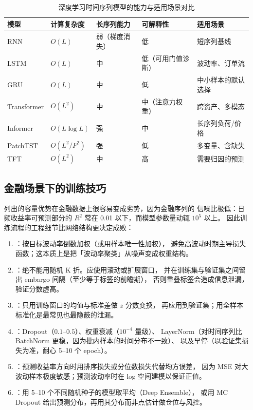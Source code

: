 \begin{table}[htbp]
\centering
\caption{深度学习时间序列模型的能力与适用场景对比}\label{tab:09-dl-compare}
\tablefont
\begin{tabular}{@{}p{2.3cm}p{2.1cm}p{2.3cm}p{2.2cm}p{3.1cm}@{}}
\toprule
模型 & 计算复杂度 & 长序列能力 & 可解释性 & 适用场景 \\
\midrule
RNN & $O(L)$ & 弱（梯度消失） & 低 & 短序列基线 \\
LSTM & $O(L)$ & 中 & 低（可用门值诊断） & 波动率、订单流 \\
GRU & $O(L)$ & 中 & 低 & 中小样本的默认选择 \\
Transformer & $O(L^2)$ & 中 & 中（注意力权重） & 跨资产、多模态 \\
Informer & $O(L\log L)$ & 强 & 中 & 长序列负荷/价格 \\
PatchTST & $O(L^2/P^2)$ & 强 & 低 & 多变量、含缺失 \\
TFT & $O(L^2)$ & 中 & 高 & 需要归因的预测 \\
\bottomrule
\end{tabular}
\end{table}

\subsection{金融场景下的训练技巧}

 列出的容量优势在金融数据上很容易变成劣势，因为金融序列的
信噪比极低：日频收益率可预测部分的 $R^2$ 常在 0.01 以下，而模型参数量动辄 $10^5$ 以上。
因此训练流程的工程细节比网络结构更决定成败：

\begin{enumerate}[leftmargin=*]
  \item {}：按目标波动率倒数加权（或用样本唯一性加权），
  避免高波动时期主导损失函数；这本质上是把「波动率聚类」从噪声变成权重结构。
  \item {}：绝不能用随机 K 折。应使用滚动或扩展窗口，
  并在训练集与验证集之间留出 embargo 间隔（至少等于标签的前瞻期），
  否则重叠标签会造成信息泄漏，验证分数虚高。
  \item {}：只用训练窗口的均值与标准差做 $z$ 分数变换，
  再应用到验证集；用全样本标准化是最常见也最隐蔽的泄漏。
  \item {}：Dropout（$0.1$--$0.5$）、权重衰减（$10^{-4}$ 量级）、
  LayerNorm（对时间序列比 BatchNorm 更稳，因为批内样本的时间分布不一致）、
  以及早停（以验证集损失为准，耐心 5--10 个 epoch）。
  \item {}：预测收益率方向时用排序损失或分位数损失代替均方误差，
  因为 MSE 对大波动样本极度敏感；预测波动率时在 log 空间建模以保证正值。
  \item {}：用 5--10 个不同随机种子的模型取平均（Deep Ensemble），
  或用 MC Dropout 给出预测分布，再用其分布而非点估计做仓位与风控。
\end{enumerate}

